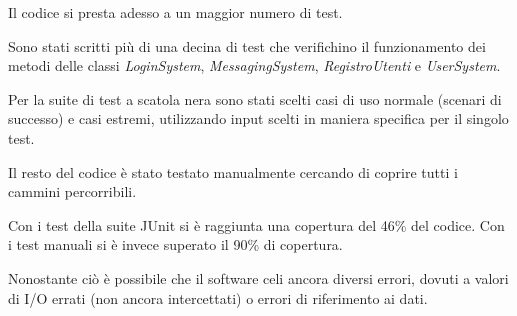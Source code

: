 \documentclass[12pt]{report}
\begin{document}
	Il codice si presta adesso a un maggior numero di test.
	
	Sono stati scritti più di una decina di test che verifichino il funzionamento dei metodi delle classi \textit{LoginSystem}, \textit{MessagingSystem}, \textit{RegistroUtenti} e \textit{UserSystem}.
	
	Per la suite di test a scatola nera sono stati scelti casi di uso normale (scenari di successo) e casi estremi, utilizzando input scelti in maniera specifica per il singolo test.
	
	Il resto del codice è stato testato manualmente cercando di coprire tutti i cammini percorribili.
	
	Con i test della suite JUnit si è raggiunta una copertura del 46\% del codice. Con i test manuali si è invece superato il 90\% di copertura.
	
	Nonostante ciò è possibile che il software celi ancora diversi errori, dovuti a valori di I/O errati (non ancora intercettati) o errori di riferimento ai dati. 
	
	
	
	
\end{document}
